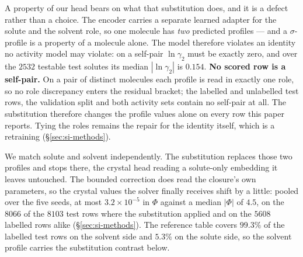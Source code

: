 A property of our head bears on what that substitution does, and it is a defect rather than a
choice. The encoder carries a separate learned adapter for the solute and the solvent role, so one
molecule has \emph{two} predicted profiles --- and a $\sigma$-profile is a property of a molecule
alone. The model therefore violates an identity no activity model may violate: on a self-pair
$\ln\gamma_2$ must be exactly zero, and over the $2532$ testable test solutes its median
$|\ln\gamma_2|$ is $0.154$. \textbf{No scored row is a self-pair.} On a pair of distinct molecules
each profile is read in exactly one role, so no role discrepancy enters the residual bracket; the
labelled and unlabelled test rows, the validation split and both activity sets contain no self-pair
at all. The substitution therefore changes the profile values alone on every row this paper reports.
Tying the roles remains the repair for the identity itself, which is a retraining
(\S\ref{sec:si-methods}).

We match solute and solvent independently. The substitution replaces those two profiles and stops there,
the crystal head reading a solute-only embedding it leaves untouched. The bounded
correction does read the closure's own parameters, so the crystal values the solver finally receives
shift by a little: pooled over the five seeds, at most $3.2\times10^{-5}$ in $\Phi$ against a median
$|\Phi|$ of $4.5$, on the $8066$ of the $8103$ test rows where the substitution applied and on the
$5608$ labelled rows alike (\S\ref{sec:si-methods}). The reference table covers $99.3\%$ of the
labelled test rows on the solvent side and $5.3\%$ on the solute side, so the solvent profile
carries the substitution contrast below.


